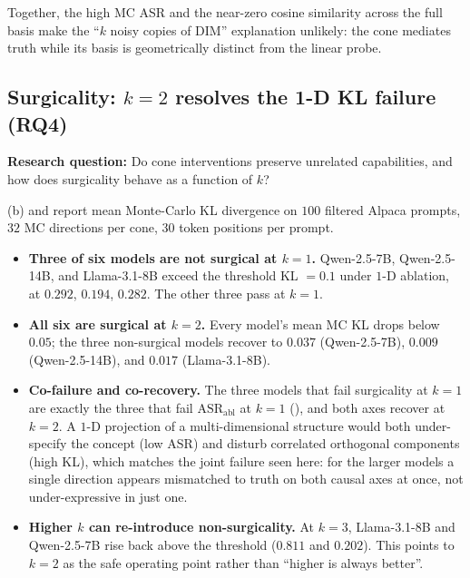 \documentclass[sn-basic]{sn-jnl}
\begin{document}
Together, the high MC ASR and the near-zero cosine similarity across the full
basis make the ``$k$ noisy copies of DIM'' explanation unlikely: the cone
mediates truth while its basis is geometrically distinct from the linear probe.



\subsection{Surgicality: \texorpdfstring{$k{=}2$}{k=2} resolves the 1-D KL
failure (RQ4)}
\label{sec:exp_kl}

\textbf{Research question:} Do cone interventions preserve unrelated
capabilities, and how does surgicality behave as a function of $k$?

(b) and  report mean Monte-Carlo KL divergence on
$100$ filtered Alpaca prompts, $32$ MC directions per cone, $30$ token positions
per prompt.

\begin{itemize}[leftmargin=*,nosep]
\item \textbf{Three of six models are not surgical at $k=1$.} Qwen-2.5-7B,
Qwen-2.5-14B, and Llama-3.1-8B exceed the threshold KL $= 0.1$ under $1$-D
ablation, at $0.292$, $0.194$, $0.282$. The other three pass at $k = 1$.

\item \textbf{All six are surgical at $k=2$.} Every model's mean MC KL drops
below $0.05$; the three non-surgical models recover to $0.037$ (Qwen-2.5-7B),
$0.009$ (Qwen-2.5-14B), and $0.017$ (Llama-3.1-8B).

\item \textbf{Co-failure and co-recovery.} The three models that fail
surgicality at $k=1$ are exactly the three that fail $\mathrm{ASR}_{\text{abl}}$
at $k=1$ (), and both axes recover at $k=2$. A
$1$-D projection of a multi-dimensional structure would both under-specify the
concept (low ASR) and disturb correlated orthogonal components (high KL), which
matches the joint failure seen here: for the larger models a single direction
appears mismatched to truth on both causal axes at once, not under-expressive in
just one.

\item \textbf{Higher $k$ can re-introduce non-surgicality.} At $k=3$,
Llama-3.1-8B and Qwen-2.5-7B rise back above the threshold ($0.811$ and
$0.202$). This points to $k=2$ as the safe operating point rather than ``higher
is always better''.
\end{itemize}
\end{document}

